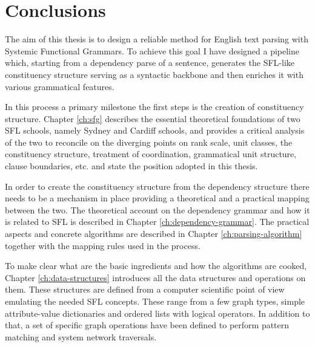 \chapter{Conclusions}
\label{ch:conclusions}




The aim of this thesis is to design a reliable method for English text parsing with Systemic Functional Grammars. To achieve this goal I have designed a pipeline which, starting from a dependency parse of a sentence, generates the SFL-like constituency structure serving as a syntactic backbone and then enriches it with various grammatical features. 

In this process a primary milestone the first steps is the creation of constituency structure. Chapter \ref{ch:sfg} describes the essential theoretical foundations of two SFL schools, namely Sydney and Cardiff schools, and provides a critical analysis of the two to reconcile on the diverging points on rank scale, unit classes, the constituency structure, treatment of coordination, grammatical unit structure, clause boundaries, etc. and state the position adopted in this thesis. 

In order to create the constituency structure from the dependency structure there needs to be a mechanism in place providing a theoretical and a practical mapping between the two. The theoretical account on the dependency grammar and how it is related to SFL is described in Chapter \ref{ch:dependency-grammar}. The practical aspects and concrete algorithms are described in Chapter \ref{ch:parsing-algorithm} together with the mapping rules used in the process. 

To make clear what are the basic ingredients and how the algorithms are cooked, Chapter \ref{ch:data-structures} introduces all the data structures and operations on them. These structures are defined from a computer scientific point of view emulating the needed SFL concepts. These range from a few graph types, simple attribute-value dictionaries and ordered lists with logical operators. In addition to that, a set of specific graph operations have been defined to perform pattern matching and system network traversals.

